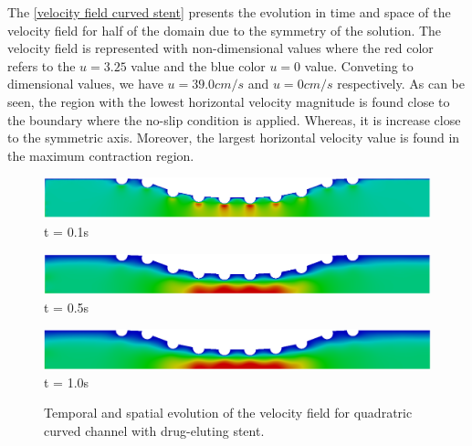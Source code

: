 \newpage
The \ref{velocity field curved stent} presents the evolution in 
time and space of the velocity field for half of the domain
due to the symmetry of the solution. 
The velocity field is represented with non-dimensional values 
where the red color refers to the $u=3.25$ value and the blue color 
$u=0$ value. Conveting to dimensional values, 
we have $u=39.0cm/s$ and $u=0cm/s$ respectively.
As can be seen, the region with the lowest horizontal velocity 
magnitude is found close to the boundary where the no-slip
condition is applied. Whereas, it is increase close to 
the symmetric axis. Moreover, the largest horizontal velocity value
is found in the maximum contraction region.


\vspace{1cm} 
\begin{figure}[H]
     \caption{
Temporal and spatial evolution of the velocity field for quadratric curved channel with
drug-eluting stent.}
     \begin{minipage}{.50\linewidth}
      \centering
      \includegraphics[scale=0.18]{./02_chaps/cap_solution/figure/vel_quadCurvedStrut1.png}\\
      t = 0.1s
     \end{minipage}%
     \begin{minipage}{.50\linewidth}
      \centering
      \includegraphics[scale=0.18]{./02_chaps/cap_solution/figure/vel_quadCurvedStrut2.png}\\
      t = 0.5s
     \end{minipage}
     \begin{minipage}{.50\linewidth}
     \medskip
      \centering
      \includegraphics[scale=0.18]{./02_chaps/cap_solution/figure/vel_quadCurvedStrut3.png}\\
      t = 1.0s
     \end{minipage}%
     \begin{minipage}{.50\linewidth}
     \medskip
      \centering

\end{minipage}
\end{figure}
